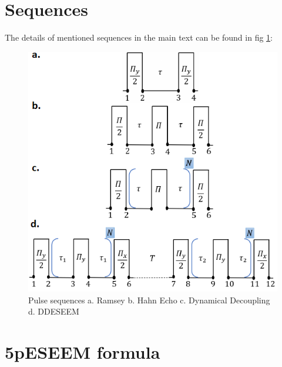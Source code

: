 \documentclass[%
 reprint,
superscriptaddress,
 amsmath,amssymb,
 aps,
]{revtex4-2}
\begin{document}
\section{Sequences}
\label{app:seqs}
The details of mentioned sequences in the main text can be found in fig \ref{fig:seqs}:
\begin{figure}%
	\begin{center}
		\includegraphics[width=0.9\columnwidth]{pict/seqs.png}
		\caption{Pulse sequences a. Ramsey b. Hahn Echo c. Dynamical Decoupling d. DDESEEM}
		\label{fig:seqs}
	\end{center}
\end{figure}

\section{5pESEEM formula}
\label{app:5pESEEM} 
\end{document}
